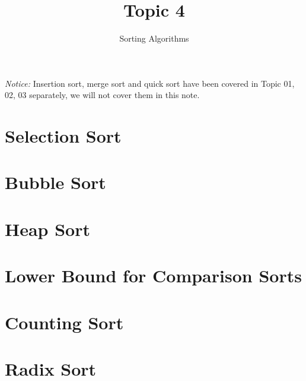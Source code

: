 \documentclass[11pt, a4paper]{COMP3711}
\title{Topic 4}
\subtitle{Sorting Algorithms}
\begin{document}
\begin{spacing}{1.5}

    {\it Notice: } Insertion sort, merge sort and 
    quick sort have been covered in Topic 01, 02, 03
    separately, we will not cover them in this note.
    
    \section{Selection Sort}



    \section{Bubble Sort}


    \section{Heap Sort}

    
    \section{Lower Bound for Comparison Sorts}


    \section{Counting Sort}
    

    \section{Radix Sort}

    
\end{spacing}
\end{document}
